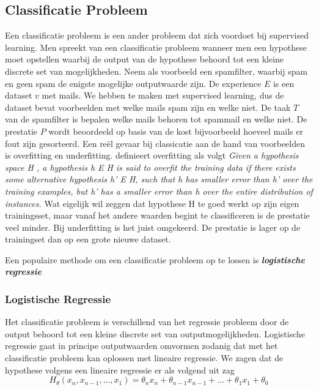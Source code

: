 \subsection{Classificatie Probleem}\label{Classificatie Probleem}

Een classificatie probleem is een ander probleem dat zich voordoet bij supervised learning. Men spreekt van een classificatie probleem wanneer men een hypothese moet opstellen waarbij de output van de hypothese behoord tot een kleine discrete set van mogelijkheden. Neem als voorbeeld een spamfilter, waarbij spam en geen spam de enigste mogelijke outputwaarde zijn. De experience $E$ is een dataset $v$ met mails. We hebben te maken met supervised learning, dus de dataset bevat voorbeelden met welke mails spam zijn en welke niet. De taak $T$ van de spamfilter is bepalen welke mails behoren tot spammail en welke niet. De prestatie $P$ wordt beoordeeld op basis van de kost bijvoorbeeld hoeveel mails er fout zijn gesorteerd.
\newline
Een re\"el gevaar bij classicatie aan de hand van voorbeelden is overfitting en underfitting.
\citet{mitchell1997machine} definieert overfitting als volgt
\newline
\textit{Given a hypothesis space H , a hypothesis h E H is said to overfit the training data if there exists some alternative hypothesis h' E H, such that h has smaller error than h' over the training examples, but h' has a smaller error than h over the entire distribution of instances.}
\newline
Wat eigelijk wil zeggen dat hypothese H te goed werkt op zijn eigen trainingsset, maar vanaf het andere waarden begint te classificeren is de prestatie veel minder. Bij underfitting is het juist omgekeerd. De prestatie is lager op de trainingset dan op een grote nieuwe dataset.

Een populaire methode om een classificatie probleem op te lossen is \textbf{\textit{logistische regressie}}

\subsubsection{Logistische Regressie}\label{Logistische Regressie}

Het classificatie probleem is verschillend van het regressie probleem door de output behoord tot een kleine discrete set van outputmogelijkheden. Logistische regressie gaat in principe outputwaarden omvormen zodanig dat met het classificatie probleem kan oplossen met lineaire regressie. We zagen dat de hypothese volgens een lineaire regressie er als volgend uit zag
\[ H_{\theta}(x_{n}, x_{n-1},...,x_{1}) = \theta_{n}x_{n} + \theta_{n-1}x_{n-1} + ... + \theta_{1}x_{1} + \theta_{0}  \] 

